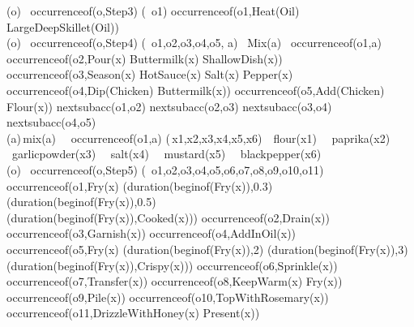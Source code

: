 \begin{center}
(\forall o) \ occurrence\textunderscore of(o,Step3) \supset (\exists\, o1) \land occurrence\textunderscore of(o1,Heat(Oil) \land LargeDeepSkillet(Oil)) \\

(\forall o) \ occurrence\textunderscore of(o,Step4) \supset (\exists\, o1,o2,o3,o4,o5, a) \ Mix(a) \ \land occurrence\textunderscore of(o1,a) \land occurrence\textunderscore of(o2,Pour(x) \land Buttermilk(x) \land ShallowDish(x)) \land occurrence\textunderscore of(o3,Season(x) \land HotSauce(x) \land Salt(x) \land Pepper(x) \land occurrence\textunderscore of(o4,Dip(Chicken) \land Buttermilk(x)) \land occurrence\textunderscore of(o5,Add(Chicken) \land Flour(x)) \land  next\textunderscore subacc(o1,o2) \land  next\textunderscore subacc(o2,o3) \land  next\textunderscore subacc(o3,o4) \land  next\textunderscore subacc(o4,o5) \\ 

(\forall a)\,mix(a) \  \land \  occurrence\textunderscore of(o1,a) \supset (\exists\,x1,x2,x3,x4,x5,x6)\  \ flour(x1) \ \land \  paprika(x2) \land \ garlicpowder(x3) \   \land \ salt(x4)  \  \land \  mustard(x5)  \  \land \  blackpepper(x6) \\

(\forall o) \ occurrence\textunderscore of(o,Step5) \supset (\exists\, o1,o2,o3,o4,o5,o6,o7,o8,o9,o10,o11) \land occurrence\textunderscore of(o1,Fry(x) \land (duration(beginof(Fry(x)),0.3) \lor  (duration(beginof(Fry(x)),0.5) \\ \lor (duration(beginof(Fry(x)),Cooked(x))) \land occurrence\textunderscore of(o2,Drain(x)) \land
occurrence\textunderscore of(o3,Garnish(x)) \land
occurrence\textunderscore of(o4,AddInOil(x)) \\ \land occurrence\textunderscore of(o5,Fry(x) \land (duration(beginof(Fry(x)),2) \lor (duration(beginof(Fry(x)),3) \lor (duration(beginof(Fry(x)),Crispy(x))) \land
occurrence\textunderscore of(o6,Sprinkle(x)) \land occurrence\textunderscore of(o7,Transfer(x)) \land occurrence\textunderscore of(o8,KeepWarm(x) \land Fry(x)) \land occurrence\textunderscore of(o9,Pile(x)) \land occurrence\textunderscore of(o10,TopWithRosemary(x)) \\ \land occurrence\textunderscore of(o11,DrizzleWithHoney(x) \land Present(x))

\end{center}
